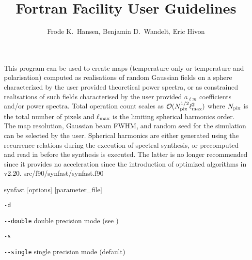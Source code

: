
\sloppy


\title{\healpix Fortran Facility User Guidelines}
 \section[synfast]{\nosectionname}
\label{fac:synfast}
\author{Frode K.~Hansen, Benjamin D.~Wandelt, Eric Hivon}

\begin{facility}
{This program can be used to create  \healpix maps (temperature only
or temperature and polarisation)  computed as realisations 
of random Gaussian
fields on a sphere characterized by the user provided 
theoretical power spectra,
or as constrained realisations of such fields characterised by the user
provided $a_{\ell m}$ coefficients and/or power spectra.
Total operation count scales as
 ${\cal {O}}(N_{\mathrm{pix}}^{1/2}\ell_{\mathrm{max}}^2)$ where $N_{\mathrm{pix}}$ is the total number of pixels and 
$\ell_{\mathrm{max}}$ is the limiting spherical harmonics order. 
The map resolution, Gaussian beam FWHM,  
and random seed for the simulation can be selected by the user.
Spherical harmonics are either generated using the recurrence relations
during the execution of spectral synthesis, or  precomputed and read in
before the synthesis is executed. The latter is no longer recommended since
it provides no acceleration since the introduction of optimized algorithms
in \healpix v2.20. }
{src/f90/synfast/synfast.f90}
\end{facility}

\begin{f90facility}
{synfast [options] [parameter\_file]}
\end{f90facility}

\begin{options}
  \begin{optionlistwide}{} %
    \item[{\tt -d}]
    \item[{\tt -}{\tt -}{\tt double}] double precision mode (see 
)
    \item[{\tt -s}]
    \item[{\tt -}{\tt -}{\tt single}] single precision mode (default)
  \end{optionlistwide}
\end{options}

